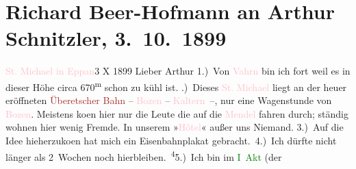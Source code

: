 

               \section[Richard Beer-Hofmann an Arthur Schnitzler, 3. 10. 1899]{ Richard Beer-Hofmann an Arthur Schnitzler, 3. 10. 1899}\nopagebreak{}\rehead{ }\normalsize\beginnumbering{} \toendnotes[C]{\smallbreak\pagebreak[2]} 
\toendnotes[C]{\smallbreak}\pstart
           \raggedleft{}{\pb}\textcolor{pink}{St. Michael in Eppan}{}\ledrightnote{\textcolor{pink}{Sankt Michael}}{ }3 X 1899\pend
           \pstart
           Lieber Arthur 1.) Von \textcolor{pink}{Vahrn}{}\ledrightnote{\textcolor{pink}{Vahrn}} bin ich
               fort weil es in dieser Höhe circa 670\textsuperscript{m} schon zu kühl
               ist.\pend
           .) Dieses \textcolor{pink}{St. Michael}{}\ledrightnote{\textcolor{pink}{Sankt Michael}} liegt an der heuer
               eröffneten \textcolor{brown}{Überetscher Bahn}{}\ledrightnote{\textcolor{brown}{Überetscher Bahn}} – \textcolor{pink}{Bozen}{}\ledrightnote{\textcolor{pink}{Bozen}} – \textcolor{pink}{Kaltern}{}\ledrightnote{\textcolor{pink}{Caldaro sulla strada del vino}} –, nur eine
               Wagenstunde von \textcolor{pink}{Bozen}{}\ledrightnote{\textcolor{pink}{Bozen}}. Meistens ko{\geminationm}en hier nur die Leute die auf die \textcolor{pink}{Mendel}{}\ledrightnote{\textcolor{pink}{Mendelpass}} fahren durch; ständig wohnen hier wenig Fremde. In
               unserem »\textcolor{pink}{Hôtel}{}\ledrightnote{\textcolor{pink}{Eppaner Hof}}« außer uns Niemand. 3.) Auf die
               Idee hieherzuko{\geminationm}en hat mich ein Eisenbahnplakat
               gebracht. 4.) Ich dürfte nicht länger als 2 Wochen noch hierbleiben. \substVorne{}\textsuperscript{4}\substDazwischen{}5\substHinten{}.) Ich bin im \textcolor{green}{I Akt}{} (der
